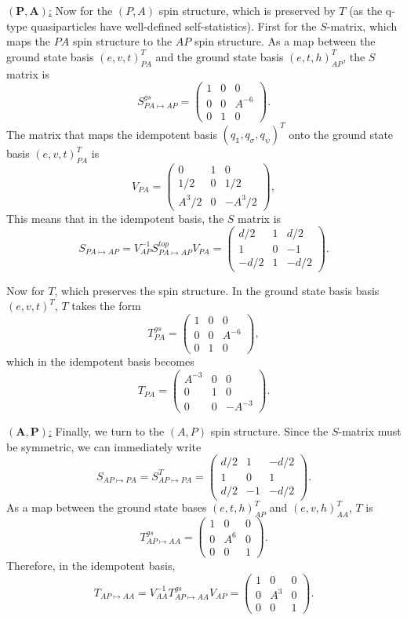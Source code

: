 \documentclass[12pt,a4paper]{article}
\newcommand{\unit}{\mathds{1}}
\newcommand\be            {\begin{equation}}
\newcommand\ee            {\end{equation}}
\begin{document}
\underline{$\mathbf{(P,A)}$:} Now for the $(P,A)$ spin structure, which is preserved by $T$ (as the q-type quasiparticles have well-defined self-statistics). First for the $S$-matrix, which maps the $PA$ spin structure to the $AP$ spin structure. As a map between the ground state basis $(e,v,t)_{PA}^T$ and the ground state basis $(e,t,h)_{AP}^T$, the $S$ matrix is
\be S^{gs}_{PA\mapsto AP} = \begin{pmatrix}
1 & 0& 0 \\ 0 & 0 & A^{-6} \\ 0&1& 0
\end{pmatrix}.\ee
The matrix that maps the idempotent basis $(q_\unit,q_\sigma,q_\psi)^T$ onto the ground state basis $(e,v,t)_{PA}^T$ is 
\be V_{PA} = \begin{pmatrix}
0 & 1 & 0 \\ 1/2 & 0 & 1/2 \\ A^3/2 & 0 & -A^3/2
\end{pmatrix},\ee
This means that in the idempotent basis, the $S$ matrix is 
\be S_{PA \mapsto AP} = V_{AP}^{-1} S^{top}_{PA \mapsto AP} V_{PA} = \begin{pmatrix}
d/2 & 1 & d/2 \\ 1 & 0 & -1 \\ -d/2 & 1 & -d/2
\end{pmatrix}.\ee

Now for $T$, which preserves the spin structure. In the ground state basis basis $(e,v,t)^T$, $T$ takes the form 
\be T^{gs}_{PA} = \begin{pmatrix}
1 & 0 & 0\\ 0 & 0 & A^{-6} \\ 0&1&0 
\end{pmatrix},\ee
which in the idempotent basis becomes 
\be T_{PA}  = \begin{pmatrix}
A^{-3} & 0 & 0 \\ 0 & 1 & 0 \\ 0 & 0 & -A^{-3}
\end{pmatrix}.\ee

\underline{$\mathbf{(A,P)}$:} Finally, we turn to the $(A,P)$ spin structure. 
Since the $S$-matrix must be symmetric, we can immediately write 
\be S_{AP \mapsto PA} =  S_{AP \mapsto PA}^T = \begin{pmatrix}
d/2 & 1 & -d/2 \\ 1 & 0 & 1 \\ d/2 & -1 & -d/2
\end{pmatrix}.\ee
As a map between the ground state bases $(e,t,h)^T_{AP}$ and $(e,v,h)^T_{AA}$, $T$ is 
\be T^{gs}_{AP \mapsto AA} = \begin{pmatrix}
1 &0&0 \\ 0&A^6 &0\\0&0&1
\end{pmatrix}.\ee
Therefore, in the idempotent basis, 
\be T_{AP\mapsto AA} = V_{AA}^{-1} T^{gs}_{AP\mapsto AA} V_{AP} = \begin{pmatrix}
1 &0&0 \\ 0&A^3&0\\0&0&1
\end{pmatrix}.\ee
\end{document}
